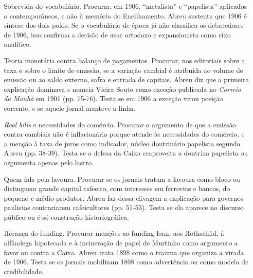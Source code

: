 \begin{dialogo}
\item Sobrevida do vocabulário. Procurar, em 1906, ``metalista'' e ``papelista''
aplicados a contemporâneos, e não à memória do Encilhamento. Abreu sustenta que
1906 é síntese dos dois polos. Se o vocabulário de época já não classifica os
debatedores de 1906, isso confirma a decisão de usar ortodoxo e expansionista como
eixo analítico.

\item Teoria monetária contra balanço de pagamentos. Procurar, nos editoriais
sobre a taxa e sobre o limite de emissão, se a variação cambial é atribuída ao
volume de emissão ou ao saldo externo, safra e entrada de capitais. Abreu diz que
a primeira explicação dominava e nomeia Vieira Souto como exceção publicada no
\emph{Correio da Manhã} em 1901 (pp. 75-76). Testa se em 1906 a exceção virou
posição corrente, e se aquele jornal manteve a linha.

\item \emph{Real bills} e necessidades do comércio. Procurar o argumento de que a
emissão contra cambiais não é inflacionária porque atende às necessidades do
comércio, e a menção à taxa de juros como indicador, núcleo doutrinário papelista
segundo Abreu (pp. 38-39). Testa se a defesa da Caixa reaproveita a doutrina
papelista ou argumenta apenas pelo lastro.

\item Quem fala pela lavoura. Procurar se os jornais tratam a lavoura como bloco
ou distinguem grande capital cafeeiro, com interesses em ferrovias e bancos, do
pequeno e médio produtor. Abreu faz dessa clivagem a explicação para governos
paulistas contrariarem cafeicultores (pp. 51-53). Testa se ela aparece no discurso
público ou é só construção historiográfica.

\item Herança do funding. Procurar menções ao funding loan, aos Rothschild, à
alfândega hipotecada e à incineração de papel de Murtinho como argumento a favor
ou contra a Caixa. Abreu trata 1898 como o trauma que organiza a virada de 1906.
Testa se os jornais mobilizam 1898 como advertência ou como modelo de
credibilidade.
\end{dialogo}

